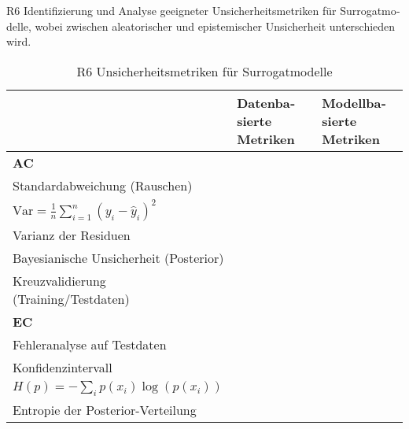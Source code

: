 \begin{otherlanguage}{ngerman}
\pagebreak


R6 Identifizierung und Analyse geeigneter Unsicherheitsmetriken für Surrogatmodelle, wobei zwischen aleatorischer und epistemischer Unsicherheit unterschieden wird.

\begin{table}[htpb]
  \centering
  \begin{tabularx}{\textwidth}{|l|l|X|}
    \hline
    & \textbf{Datenbasierte Metriken} & \textbf{Modellbasierte Metriken} \\
    \hline
    \textbf{AC} & 
    \begin{tabular}[c]{@{}l@{}} 
      \( \sigma = \sqrt{\frac{1}{n} \sum_{i=1}^{n} (y_i - \hat{y}_i)^2} \) \\ 
      Standardabweichung (Rauschen) \\[1ex]
      \( \text{Var} = \frac{1}{n} \sum_{i=1}^{n} (y_i - \hat{y}_i)^2 \) \\ 
      Varianz der Residuen
    \end{tabular}
    & 
    \begin{tabular}[c]{@{}l@{}} 
      \( p(\theta \mid \mathcal{D}) \) \\ 
      Bayesianische Unsicherheit (Posterior) \\[1ex]
      Kreuzvalidierung (Training/Testdaten)
    \end{tabular} \\
    \hline
    \textbf{EC} & 
    \begin{tabular}[c]{@{}l@{}} 
      \( \text{Fehler} = \sum_{i=1}^{n} |y_i - \hat{y}_i| \) \\ 
      Fehleranalyse auf Testdaten
    \end{tabular}
    & 
    \begin{tabular}[c]{@{}l@{}} 
      \( \hat{y} \pm z \cdot \sigma \) \\ 
      Konfidenzintervall \\[1ex]
      \( H(p) = - \sum_{i} p(x_i) \log(p(x_i)) \) \\ 
      Entropie der Posterior-Verteilung
    \end{tabular} \\
    \hline
  \end{tabularx}
  \caption{R6 Unsicherheitsmetriken für Surrogatmodelle}\label{tab:chapter6r61}
\end{table}



\end{otherlanguage}
